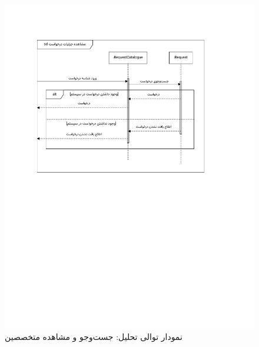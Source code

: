 \begin{figure}[ht!]
	\centering
	\includegraphics[scale=0.8, page=7]{figs/OOD-Sequence-2.pdf}
	\caption{نمودار توالی تحلیل: جست‌وجو و مشاهده متخصصین}
\end{figure}
\FloatBarrier
\newpage

